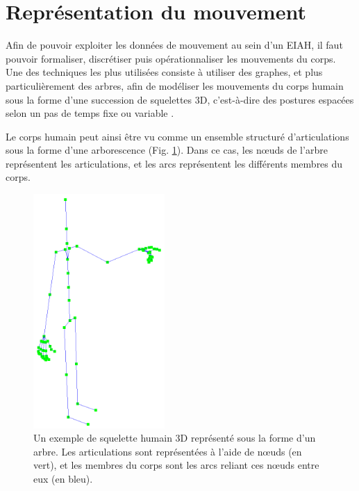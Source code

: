 
\section{Représentation du mouvement}
Afin de pouvoir exploiter les données de mouvement au sein d'un EIAH, il faut pouvoir formaliser, discrétiser puis opérationnaliser les mouvements du corps. Une des techniques les plus utilisées consiste à utiliser des graphes, et plus particulièrement des arbres, afin de modéliser les mouvements du corps humain sous la forme d'une succession de squelettes 3D, c'est-à-dire des postures espacées selon un pas de temps fixe ou variable \parencite{Lewis2000Psd}.

Le corps humain peut ainsi être vu comme un ensemble structuré d'articulations sous la forme d'une arborescence (Fig. \ref{fig:3D_skeleton_tree_example}). Dans ce cas, les nœuds de l'arbre représentent les articulations, et les arcs représentent les différents membres du corps.

\begin{figure}[h]
    \centering
    \includegraphics[width=5cm]{pictures/3D_skeleton_tree_example.png}
    \caption[Représentation informatique d'un squelette humain en 3D]{Un exemple de squelette humain 3D représenté sous la forme d'un arbre. Les articulations sont représentées à l'aide de nœuds (en vert), et les membres du corps sont les arcs reliant ces nœuds entre eux (en bleu).}
    \label{fig:3D_skeleton_tree_example}
\end{figure}

